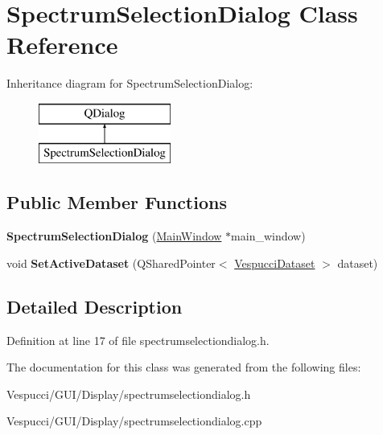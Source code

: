 \hypertarget{class_spectrum_selection_dialog}{}\section{Spectrum\+Selection\+Dialog Class Reference}
\label{class_spectrum_selection_dialog}
Inheritance diagram for Spectrum\+Selection\+Dialog\+:\begin{figure}[H]
\begin{center}
\leavevmode
\includegraphics[height=2.000000cm]{class_spectrum_selection_dialog}
\end{center}
\end{figure}
\subsection*{Public Member Functions}
\begin{DoxyCompactItemize}
\item 
{\bfseries Spectrum\+Selection\+Dialog} (\hyperlink{class_main_window}{Main\+Window} $\ast$main\+\_\+window)\hypertarget{class_spectrum_selection_dialog_a7e2c757bd7792431746865e95af55121}{}\label{class_spectrum_selection_dialog_a7e2c757bd7792431746865e95af55121}

\item 
void {\bfseries Set\+Active\+Dataset} (Q\+Shared\+Pointer$<$ \hyperlink{class_vespucci_dataset}{Vespucci\+Dataset} $>$ dataset)\hypertarget{class_spectrum_selection_dialog_a223f26816239b1f78c3839def757547a}{}\label{class_spectrum_selection_dialog_a223f26816239b1f78c3839def757547a}

\end{DoxyCompactItemize}


\subsection{Detailed Description}


Definition at line 17 of file spectrumselectiondialog.\+h.



The documentation for this class was generated from the following files\+:\begin{DoxyCompactItemize}
\item 
Vespucci/\+G\+U\+I/\+Display/spectrumselectiondialog.\+h\item 
Vespucci/\+G\+U\+I/\+Display/spectrumselectiondialog.\+cpp\end{DoxyCompactItemize}
